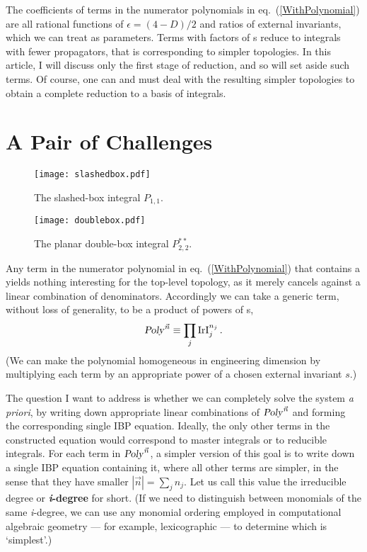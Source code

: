 \documentclass[aps,prd,preprint,groupedaddress,nofootinbib,showpacs,eqsecnum]{revtex4}
\def\eqn#1{eq.~(\ref{#1})}
\def\eps{\epsilon}
\def\Pn#1#2{P_{#1,#2}}
\def\Pss#1#2{P^{**}_{#1,#2}}
\begin{document}
The coefficients of terms in the numerator 
polynomials in \eqn{WithPolynomial} are all
rational functions of $\eps = (4-D)/2$
and ratios of external invariants,
which we can treat as parameters.  Terms with factors of \PRI{}s reduce
to integrals with fewer propagators, that is corresponding to simpler
topologies.  In this article, I will discuss only the first stage
of reduction, and so will set aside such terms.  Of course, one can
and must deal with the
resulting simpler topologies to obtain a complete reduction to
a basis of integrals.

\section{A Pair of Challenges}
\label{ChallengeSection}

\begin{figure}[ht]
	\centering
	\texttt{[image: slashedbox.pdf]}
	\caption{The slashed-box integral $\Pn11$.} 
	\label{SlashedBoxFigure}
\end{figure}

\begin{figure}[ht]
	\centering
	\texttt{[image: doublebox.pdf]}
	\caption{The planar double-box integral $\Pss22$.} 
	\label{DoubleBoxFigure}
\end{figure}

\def\ideg{\textit{i\/}-degree}
Any term in the numerator polynomial in \eqn{WithPolynomial}
that contains a \PRI{} yields nothing interesting
for the top-level topology, as it merely cancels against
a linear combination of denominators.  Accordingly we can take 
a generic term,
without loss of generality, to be a product of powers of \II{}s,
\begin{equation}
\textsl{Poly\/}^{\vec n} \equiv \prod_j \textrm{IrI}_j^{n_j}\,.
\end{equation}
(We can make the polynomial homogeneous in engineering dimension by 
multiplying each term by an appropriate power of a chosen external
invariant $s$.)

The question I want to address is whether we can completely
solve the system {\it a priori\/}, by writing down appropriate linear
combinations of $\textsl{Poly\/}^{\vec n}$ and forming the corresponding single IBP
equation.  Ideally, the only other terms in the constructed equation would
correspond to master integrals or to reducible integrals.  
For each term in $\textsl{Poly\/}^{\vec n}$, a simpler version of this goal is to write down 
a single IBP equation containing it, 
where all other terms are simpler, in the sense that
they have smaller $|\vec n|=\sum_j n_j$.  Let us call this value the irreducible
degree or \textbf{\ideg{}} for short.  (If we need to distinguish
between monomials of the same \ideg{},
we can use any monomial ordering employed in computational algebraic
geometry --- for example, lexicographic --- to determine which is `simplest'.)
\end{document}
